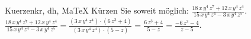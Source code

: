 \begin{MAufgabe}{Kuerzen}{kr, dh, MaTeX}
K\"urzen Sie soweit m\"oglich: $\frac{18\, x\, y^4\, z^7 + 12\, x\, y^4\, z^4}{15\, x\, y^4\, z^4 - 3\, x\, y^4\, z^5}$.\\ 
\ifLsg\MLoesung
\quad $\frac{18\, x\, y^4\, z^7 + 12\, x\, y^4\, z^4}{15\, x\, y^4\, z^4 - 3\, x\, y^4\, z^5}=\frac{(3\, x\, y^4\, z^4)\cdot(6\, z^3 + 4)}{(3\, x\, y^4\, z^4)\cdot(5 - z)}=\frac{6\, z^3 + 4}{5 - z}=\frac{ - 6\, z^3 - 4}{z - 5}$.\else\relax\fi
 \end{MAufgabe}